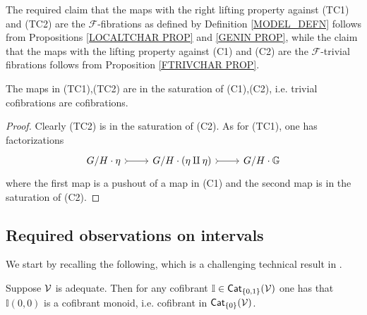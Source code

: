 \documentclass[a4paper,10pt
,draft
]{article}%
\renewcommand{\F}{\mathcal F}
\renewcommand{\1}{\eta}%
\begin{document}
\begin{remark}
	The required claim that the maps with the right lifting property against (TC1) and (TC2) are the $\F$-fibrations as defined by
	Definition \ref{MODEL_DEFN} follows from 
	Propositions \ref{LOCALTCHAR PROP} and \ref{GENIN PROP},
	while the claim that the maps with the lifting property against (C1) and (C2) are the $\F$-trivial fibrations follows from
	Proposition \ref{FTRIVCHAR PROP}.
\end{remark}




\begin{lemma}[{cf. \cite[1.19]{CM13b}}]\label{POINT_4_LEMMA}
	The maps in (TC1),(TC2) are in the saturation of (C1),(C2),
	i.e. trivial cofibrations are cofibrations.
\end{lemma}

\begin{proof}
	Clearly (TC2) is in the saturation of (C2).
	As for (TC1), one has factorizations
\begin{equation}
	\begin{tikzcd}
	G/H \cdot \1 \arrow[r, rightarrowtail]
&
	G/H \cdot (\1 \amalg \1) \arrow[r, rightarrowtail]
&
	G/H \cdot \mathbb{G}
	\end{tikzcd}
\end{equation}
where the first map is a pushout of a map in (C1) and 
the second map is in the saturation of (C2).
\end{proof}







\newpage

\subsection{Required observations on intervals}


We start by recalling the following, 
which is a challenging technical result in \cite{BM13}.

\begin{theorem}
\label{INTCOF THM}
Suppose $\mathcal V$ is {\color{blue} adequate}.
Then for any cofibrant $\mathbb{I} \in \mathsf{Cat}_{\{0,1\}}(\mathcal V)$
one has that 
$\mathbb{I}(0,0)$ %
is a cofibrant monoid, i.e. cofibrant
in $ \mathsf{Cat}_{\{0\}}(\mathcal V)$.
\end{theorem}
\end{document}
